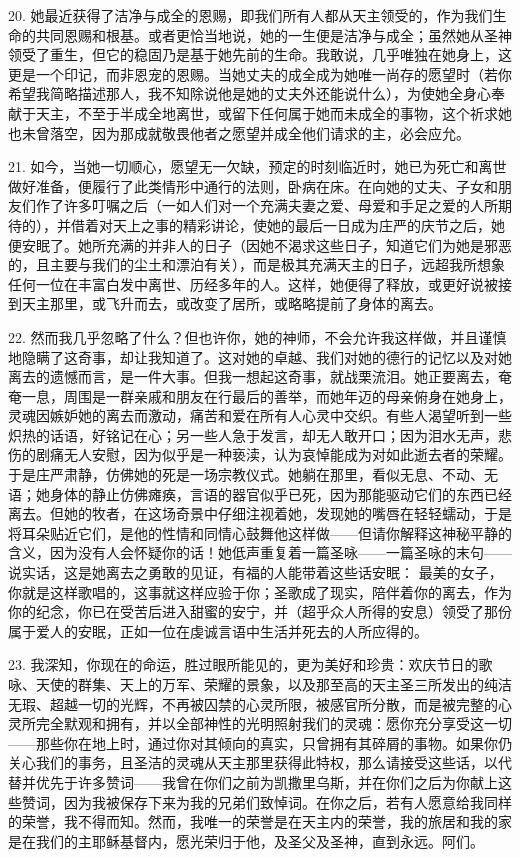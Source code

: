 20. 她最近获得了洁净与成全的恩赐，即我们所有人都从天主领受的，作为我们生命的共同恩赐和根基。或者更恰当地说，她的一生便是洁净与成全；虽然她从圣神领受了重生，但它的稳固乃是基于她先前的生命。我敢说，几乎唯独在她身上，这更是一个印记，而非恩宠的恩赐。当她丈夫的成全成为她唯一尚存的愿望时（若你希望我简略描述那人，我不知除说他是她的丈夫外还能说什么），为使她全身心奉献于天主，不至于半成全地离世，或留下任何属于她而未成全的事物，这个祈求她也未曾落空，因为那成就敬畏他者之愿望并成全他们请求的主，必会应允。\par

21. 如今，当她一切顺心，愿望无一欠缺，预定的时刻临近时，她已为死亡和离世做好准备，便履行了此类情形中通行的法则，卧病在床。在向她的丈夫、子女和朋友们作了许多叮嘱之后（一如人们对一个充满夫妻之爱、母爱和手足之爱的人所期待的），并借着对天上之事的精彩讲论，使她的最后一日成为庄严的庆节之后，她便安眠了。她所充满的并非人的日子（因她不渴求这些日子，知道它们为她是邪恶的，且主要与我们的尘土和漂泊有关），而是极其充满天主的日子，远超我所想象任何一位在丰富白发中离世、历经多年的人。这样，她便得了释放，或更好说被接到天主那里，或飞升而去，或改变了居所，或略略提前了身体的离去。\par

22. 然而我几乎忽略了什么？但也许你，她的神师，不会允许我这样做，并且谨慎地隐瞒了这奇事，却让我知道了。这对她的卓越、我们对她的德行的记忆以及对她离去的遗憾而言，是一件大事。但我一想起这奇事，就战栗流泪。她正要离去，奄奄一息，周围是一群亲戚和朋友在行最后的善举，而她年迈的母亲俯身在她身上，灵魂因嫉妒她的离去而激动，痛苦和爱在所有人心灵中交织。有些人渴望听到一些炽热的话语，好铭记在心；另一些人急于发言，却无人敢开口；因为泪水无声，悲伤的剧痛无人安慰，因为似乎是一种亵渎，认为哀悼能成为对如此逝去者的荣耀。于是庄严肃静，仿佛她的死是一场宗教仪式。她躺在那里，看似无息、不动、无语；她身体的静止仿佛瘫痪，言语的器官似乎已死，因为那能驱动它们的东西已经离去。但她的牧者，在这场奇景中仔细注视着她，发现她的嘴唇在轻轻蠕动，于是将耳朵贴近它们，是他的性情和同情心鼓舞他这样做——但请你解释这神秘平静的含义，因为没有人会怀疑你的话！她低声重复着一篇圣咏——一篇圣咏的末句——说实话，这是她离去之勇敢的见证，有福的人能带着这些话安眠： 最美的女子，你就是这样歌唱的，这事就这样应验于你；圣歌成了现实，陪伴着你的离去，作为你的纪念，你已在受苦后进入甜蜜的安宁，并（超乎众人所得的安息）领受了那份属于爱人的安眠，正如一位在虔诚言语中生活并死去的人所应得的。\par

23. 我深知，你现在的命运，胜过眼所能见的，更为美好和珍贵：欢庆节日的歌咏、天使的群集、天上的万军、荣耀的景象，以及那至高的天主圣三所发出的纯洁无瑕、超越一切的光辉，不再被囚禁的心灵所限，被感官所分散，而是被完整的心灵所完全默观和拥有，并以全部神性的光明照射我们的灵魂：愿你充分享受这一切——那些你在地上时，通过你对其倾向的真实，只曾拥有其碎屑的事物。如果你仍关心我们的事务，且圣洁的灵魂从天主那里获得此特权，那么请接受这些话，以代替并优先于许多赞词——我曾在你们之前为凯撒里乌斯，并在你们之后为你献上这些赞词，因为我被保存下来为我的兄弟们致悼词。在你之后，若有人愿意给我同样的荣誉，我不得而知。然而，我唯一的荣誉是在天主内的荣誉，我的旅居和我的家是在我们的主耶稣基督内，愿光荣归于他，及圣父及圣神，直到永远。阿们。\par

